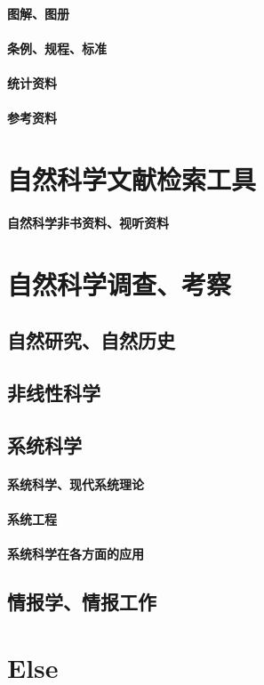 \documentclass[UTF8]{NatureUniverse}
\begin{document}
    \subsubsection{图解、图册}
    \subsubsection{条例、规程、标准}
    \subsubsection{统计资料}
    \subsubsection{参考资料}

\chapter{自然科学文献检索工具}
    \subsubsection{自然科学非书资料、视听资料}


\chapter{自然科学调查、考察}
\section{自然研究、自然历史}
\section{非线性科学}
\section{系统科学}
    \subsubsection{系统科学、现代系统理论}
    \subsubsection{系统工程}
    \subsubsection{系统科学在各方面的应用}
\section{情报学、情报工作}



\chapter{Else}
\end{document}
